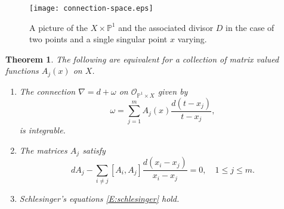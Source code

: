 \documentclass[12pt]{book}
\numberwithin{equation}{section}
\newtheorem{theorem}{Theorem}[subsection]
\theoremstyle{definition}
\theoremstyle{remark}
\newcommand{\PP}{\mathbb{P}}
\newcommand{\Ocal}{\mathcal{O}}
\begin{document}
\begin{figure}[h]\label{F:connection-space}
	\begin{center}
		\texttt{[image: connection-space.eps]}
	\end{center}
\caption{A picture of the $X\times \PP^1$ and the associated divisor $D$ in the case of two points and a single singular point $x$ varying.}
\end{figure}

\begin{theorem}
	The following are equivalent for a collection of matrix valued functions $A_j(x)$ on $X$.
	\begin{enumerate}
		\item The connection $\nabla=d+\omega$ on $\Ocal_{\PP^1\times X}$ given by 
		 $$ \omega = \sum_{j=1}^m A_j(x) \dfrac{d(t-x_j)}{t-x_j},$$
		 is integrable.
		 \item\label{I:differential-schlesinger} The matrices $A_j$ satisfy
		  $$ dA_j - \sum_{i\neq j} [A_i,A_j] \dfrac{d(x_i-x_j)}{x_i-x_j} = 0, \quad 1\leq j \leq m.$$
		  \item Schlesinger's equations \eqref{E:schlesinger} hold.
	\end{enumerate}
\end{theorem}
\end{document}
